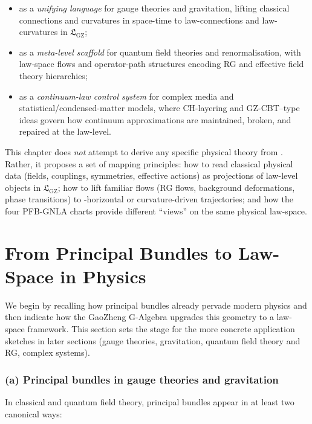\documentclass[11pt]{book}
\theoremstyle{plain}
\theoremstyle{definition}
\newcommand{\GZLS}{\ensuremath{\mathfrak{L}_{\mathrm{GZ}}}}       \newcommand{\GZLT}{\ensuremath{M_{!w}}}                           \newcommand{\GZLOC}{\ensuremath{A_M}}                             \newcommand{\GZLCurv}{\ensuremath{\mathcal{F}_{\mathrm{law}}}}
\begin{document}
\begin{itemize}
  \item as a \emph{unifying language} for gauge theories and
        gravitation, lifting classical connections and curvatures in
        space-time to law-connections and law-curvatures in \GZLS;
  \item as a \emph{meta-level scaffold} for quantum field theories and
        renormalisation, with law-space flows and operator-path
        structures encoding RG and effective field theory hierarchies;
  \item as a \emph{continuum-law control system} for complex media and
        statistical/condensed-matter models, where CH-layering and
        GZ-CBT–type ideas govern how continuum approximations are
        maintained, broken, and repaired at the law-level.
\end{itemize}

This chapter does \emph{not} attempt to derive any specific physical
theory from \GAlgebra. Rather, it proposes a set of mapping principles:
how to read classical physical data (fields, couplings, symmetries,
effective actions) as projections of law-level objects in \GZLS; how to
lift familiar flows (RG flows, background deformations, phase
transitions) to \GZTLC-horizontal or curvature-driven trajectories;
and how the four PFB-GNLA charts provide different “views” on the same
physical law-space.



\section{From Principal Bundles to Law-Space in Physics}


We begin by recalling how principal bundles already pervade modern
physics and then indicate how the GaoZheng G-Algebra upgrades this
geometry to a law-space framework. This section sets the stage for the
more concrete application sketches in later sections (gauge theories,
gravitation, quantum field theory and RG, complex systems).

\subsubsection*{(a) Principal bundles in gauge theories and gravitation}

In classical and quantum field theory, principal bundles appear in at
least two canonical ways:
\end{document}
